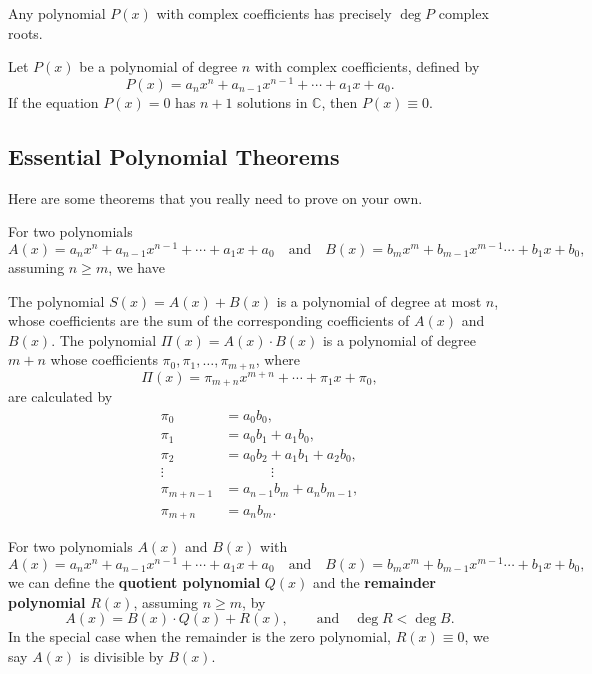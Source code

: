 \begin{theorem}
     Any polynomial $P(x)$ with complex coefficients has precisely $\deg P$ complex roots.
\end{theorem}


\begin{corollary}
    Let $P(x)$ be a polynomial of degree $n$ with complex coefficients, defined by
        \[P(x)=a_nx^n+a_{n-1}x^{n-1}+\cdots+a_1x+a_0.\]
        If the equation $P(x)=0$ has $n+1$ solutions in $\mathbb C$, then $P(x)\equiv 0$.
\end{corollary}



\subsection{Essential Polynomial Theorems}

Here are some theorems that you really need to prove on your own.


\begin{theorem}
    For two polynomials
        \[A(x)=a_nx^n+a_{n-1}x^{n-1}+\cdots+a_1x+a_0 \quad \text{and} \quad B(x)=b_mx^m+b_{m-1}x^{m-1}\cdots+b_1x+b_0,\]
        assuming $n\geq m$, we have
        \begin{tasks}
            \task The polynomial $S(x)=A(x)+B(x)$ is a polynomial of degree at most $n$, whose coefficients are the sum of the corresponding coefficients of $A(x)$ and $B(x)$.
            \task The polynomial $\Pi(x) = A(x) \cdot B(x)$ is a polynomial of degree $m+n$ whose coefficients $\pi_0,\pi_1,\dots,\pi_{m+n}$, where
            \[\Pi(x) = \pi_{m+n}x^{m+n} + \cdots + \pi_1x+\pi_0,\]
            are calculated by
            \begin{align*}
                \pi_0 &= a_0b_0,\\
                \pi_1 &= a_0b_1 + a_1b_0,\\
                \pi_2 &= a_0b_2+a_1b_1+a_2b_0,\\
                \vdots &\phantom{=} \qquad \vdots\\
                \pi_{m+n-1} &= a_{n-1}b_m + a_nb_{m-1},\\
                \pi_{m+n} &= a_nb_m.
            \end{align*}
        \end{tasks}
\end{theorem}


    \begin{theorem}
        For two polynomials $A(x)$ and $B(x)$ with
            \[A(x)=a_nx^n+a_{n-1}x^{n-1}+\cdots+a_1x+a_0 \quad \text{and} \quad B(x)=b_mx^m+b_{m-1}x^{m-1}\cdots+b_1x+b_0,\]
            we can define the \textbf{quotient polynomial} $Q(x)$ and the \textbf{remainder polynomial} $R(x)$, assuming $n\geq m$, by
            \[A(x) = B(x) \cdot Q(x) + R(x), \qquad \text{and} \quad \deg R < \deg B.\]
            In the special case when the remainder is the zero polynomial, $R(x) \equiv 0$, we say $A(x)$ is divisible by $B(x)$. 
    \end{theorem}
    
